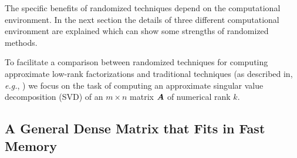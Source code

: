 \documentclass[12pt]{article}
\begin{document}
\begin{figure}
\begin{center}
\end{center}
\end{figure}

The specific benefits of randomized techniques depend on the computational environment.
 In the next section the details of three different computational environment are explained which can show some strengths of randomized methods.

To facilitate a comparison between randomized techniques for computing
approximate low-rank factorizations and traditional techniques (as
described in, \textit{e.g.}, \cite{golub})
we focus on the task of computing an approximate singular value
decomposition (SVD) of an $m\times n$ matrix $\bm{A}$ of numerical rank $k$.

\subsection{A General Dense Matrix that Fits in Fast Memory}
\label{sec:intro_fits in RAM}
\end{document}
